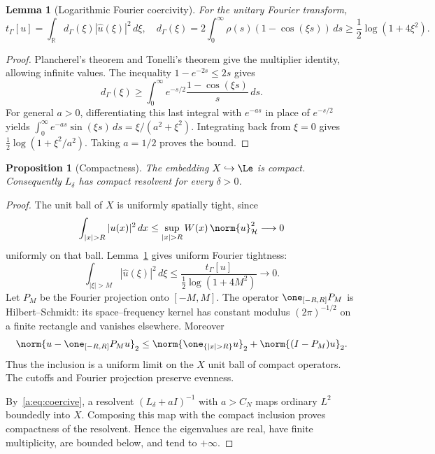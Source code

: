 \documentclass[11pt,a4paper]{article}
\numberwithin{equation}{section}
\newtheorem{proposition}[theorem]{Proposition}
\newtheorem{lemma}[theorem]{Lemma}
\theoremstyle{definition}\newtheorem{definition}[theorem]{Definition}
\theoremstyle{remark}\newtheorem{remark}[theorem]{Remark}
\newcommand{\R}{\mathbb R}\newcommand{\C}{\mathbb C}\newcommand{\N}{\mathbb N}
\newcommand{\Hh}{\mathcal H}\newcommand{\Hw}{\mathcal H}
\newcommand{\tg}{t_\Gamma}\newcommand{\cg}{c_\Gamma}
\begin{document}
\begin{lemma}[Logarithmic Fourier coercivity]\label{a:lem:fourier}
For the unitary Fourier transform,
\begin{equation}\label{a:eq:multiplier}
 \tg[u]=\int_\R d_\Gamma(\xi)|\widehat u(\xi)|^2\,d\xi,
 \quad
 d_\Gamma(\xi)=2\int_0^\infty\rho(s)(1-\cos(\xi s))\,ds
 \ge\frac12\log(1+4\xi^2).
\end{equation}
\end{lemma}
\begin{proof}
Plancherel's theorem and Tonelli's theorem give the multiplier identity, allowing infinite values. The inequality $1-e^{-2s}\le2s$ gives
\[
 d_\Gamma(\xi)\ge\int_0^\infty e^{-s/2}\frac{1-\cos(\xi s)}s\,ds.
\]
For general $a>0$, differentiating this last integral with $e^{-as}$ in place of $e^{-s/2}$ yields $\int_0^\infty e^{-as}\sin(\xi s)\,ds=\xi/(a^2+\xi^2)$. Integrating back from $\xi=0$ gives $\tfrac12\log(1+\xi^2/a^2)$. Taking $a=1/2$ proves the bound.
\end{proof}

\begin{proposition}[Compactness]\label{a:prop:compact}
The embedding $X\hookrightarrow\Le$ is compact. Consequently $L_\delta$ has compact resolvent for every $\delta>0$.
\end{proposition}
\begin{proof}
The unit ball of $X$ is uniformly spatially tight, since
\begin{equation}\label{a:eq:spatialtight}
 \int_{|x|>R}|u(x)|^2\,dx
 \le\sup_{|x|>R}W(x)\,\norm{u}_{\Hh}^2\longrightarrow0
\end{equation}
uniformly on that ball. Lemma~\ref{a:lem:fourier} gives uniform Fourier tightness:
\begin{equation}\label{a:eq:fouriertight}
 \int_{|\xi|>M}|\widehat u(\xi)|^2\,d\xi
 \le\frac{\tg[u]}{\tfrac12\log(1+4M^2)}\longrightarrow0.
\end{equation}
Let $P_M$ be the Fourier projection onto $[-M,M]$. The operator
$\one_{[-R,R]}P_M$ is Hilbert--Schmidt: its space--frequency kernel has constant modulus $(2\pi)^{-1/2}$ on a finite rectangle and vanishes elsewhere. Moreover
\[
 \norm{u-\one_{[-R,R]}P_Mu}_2
 \le\norm{\one_{\{|x|>R\}}u}_2+\norm{(I-P_M)u}_2.
\]
Thus the inclusion is a uniform limit on the $X$ unit ball of compact operators. The cutoffs and Fourier projection preserve evenness.

By~\eqref{a:eq:coercive}, a resolvent $(L_\delta+aI)^{-1}$ with $a>C_N$ maps ordinary $L^2$ boundedly into $X$. Composing this map with the compact inclusion proves compactness of the resolvent. Hence the eigenvalues are real, have finite multiplicity, are bounded below, and tend to $+\infty$.
\end{proof}
\end{document}
